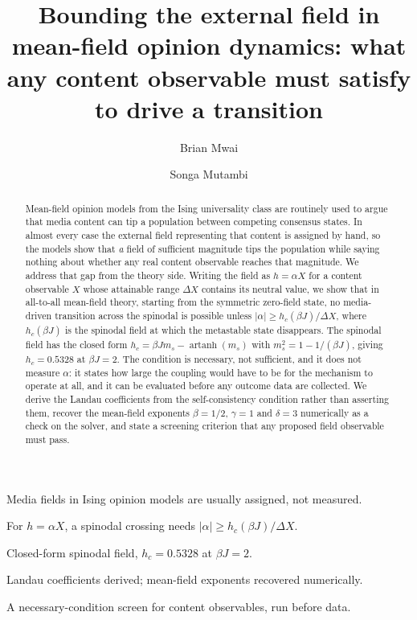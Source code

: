 \documentclass[preprint,12pt]{elsarticle}
\begin{document}
\begin{frontmatter}

\title{Bounding the external field in mean-field opinion dynamics: what any content
observable must satisfy to drive a transition}

\author[cuea]{Brian Mwai}
\author[cuea]{Songa Mutambi}

\begin{abstract}
Mean-field opinion models from the Ising universality class are routinely used to argue that
media content can tip a population between competing consensus states. In almost every case
the external field representing that content is assigned by hand, so the models show that
\emph{a} field of sufficient magnitude tips the population while saying nothing about whether
any real content observable reaches that magnitude. We address that gap from the theory side.
Writing the field as $h = \alpha X$ for a content observable $X$ whose attainable range
$\Delta X$ contains its neutral value, we show that in all-to-all mean-field theory, starting
from the symmetric zero-field state, no media-driven transition across the spinodal is
possible unless $|\alpha| \ge h_c(\beta J)/\Delta X$, where $h_c(\beta J)$ is the spinodal field
at which the metastable state disappears. The spinodal field has the closed form
$h_c = \beta J m_s - \operatorname{artanh}(m_s)$ with $m_s^2 = 1 - 1/(\beta J)$, giving
$h_c = 0.5328$ at $\beta J = 2$. The condition is necessary, not sufficient, and it does not
measure $\alpha$: it states how large the coupling would have to be for the mechanism to
operate at all, and it can be evaluated before any outcome data are collected. We derive the
Landau coefficients from the self-consistency condition rather than asserting them, recover
the mean-field exponents $\beta = 1/2$, $\gamma = 1$ and $\delta = 3$ numerically as a check
on the solver, and state a screening criterion that any proposed field observable must pass.
\end{abstract}

\begin{highlights}
\item Media fields in Ising opinion models are usually assigned, not measured.
\item For $h = \alpha X$, a spinodal crossing needs $|\alpha| \ge h_c(\beta J)/\Delta X$.
\item Closed-form spinodal field, $h_c = 0.5328$ at $\beta J = 2$.
\item Landau coefficients derived; mean-field exponents recovered numerically.
\item A necessary-condition screen for content observables, run before data.
\end{highlights}


\end{frontmatter}
\end{document}
